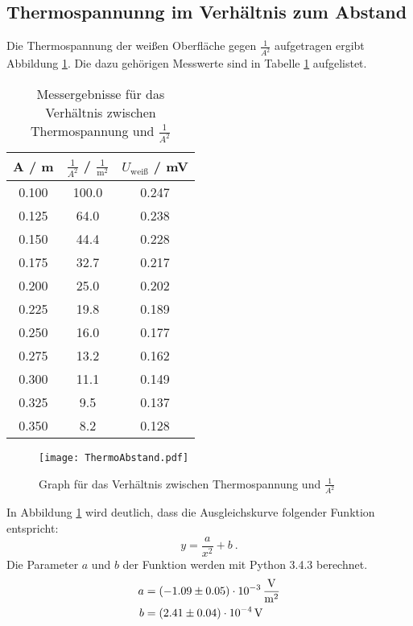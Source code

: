 \subsection{Thermospannunng im Verhältnis zum Abstand}
Die Thermospannung der weißen Oberfläche gegen $\frac{1}{A^2}$ aufgetragen ergibt Abbildung \ref{fig:Abstand}. Die dazu gehörigen Messwerte sind in Tabelle \ref{tab:Abstand} aufgelistet.
\begin{table}[H]
  \centering
  \begin{tabular}{c c c}
      A / m & $\frac{1}{A^2}$ / $\frac{1}{\text{m}^2}$ & $U_\text{weiß}$ / mV \\
    \midrule
      0.100 & 100.0  & 0.247 \\
      0.125	& 64.0   & 0.238 \\
      0.150	& 44.4   & 0.228 \\
      0.175	& 32.7   & 0.217 \\
      0.200	& 25.0   & 0.202 \\
      0.225	& 19.8   & 0.189 \\
      0.250	& 16.0   & 0.177 \\
      0.275	& 13.2   & 0.162 \\
      0.300	& 11.1   & 0.149 \\
      0.325	& 9.5    & 0.137 \\
      0.350	& 8.2    & 0.128 \\
  \end{tabular}
  \caption{Messergebnisse für das Verhältnis zwischen Thermospannung und $\frac{1}{A^2}$}
  \label{tab:Abstand}
\end{table}

\begin{figure}[H]
  \centering
  \texttt{[image: ThermoAbstand.pdf]}
  \caption{Graph für das Verhältnis zwischen Thermospannung und $\frac{1}{A^2}$}
  \label{fig:Abstand}
\end{figure}
In Abbildung \ref{tab:Abstand} wird deutlich, dass die Ausgleichskurve folgender Funktion entspricht:
\begin{equation}
  y = \frac{a}{x^2} + b \ .
\end{equation}
Die Parameter $a$ und $b$ der Funktion werden mit Python 3.4.3 berechnet.
\begin{align}
  a &= (\num{-1.09 +- 0.05}) \cdot 10^{-3} \, \frac{\text{V}}{\text{m}^2} \\
  b &= (\num{2.41 +- 0.04}) \cdot 10^{-4} \, \text{V}
\end{align}
